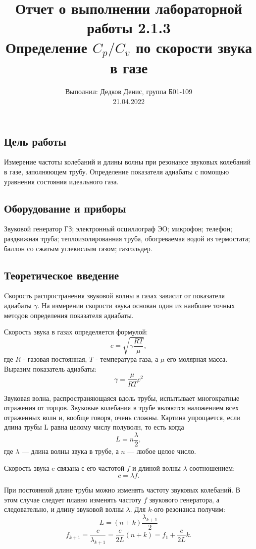 \documentclass[12pt,a4paper]{article}
\author{\normalsize Выполнил: Дедков Денис, группа Б01-109 \\
	\normalsize 21.04.2022}
\date{}
\title{
	\large Отчет о выполнении лабораторной работы 2.1.3 \\
	\Large Определение $C_p/C_v$ по скорости звука в газе \\ 
	
}
\begin{document}
	\maketitle
	
\subsection*{Цель работы}
Измерение частоты колебаний и длины волны при резонансе звуковых колебаний в газе, заполняющем трубу.
Определение показателя адиабаты с помощью уравнения состояния идеального газа.

\subsection*{Оборудование и приборы} 
Звуковой генератор ГЗ;
электронный осциллограф ЭО;
микрофон;
телефон;
раздвижная труба;
теплоизолированная труба, обогреваемая водой из термостата;
баллон со сжатым углекислым газом;
газгольдер.
	
	
\subsection*{Теоретическое введение}

Cкорость распространения звуковой волны в газах зависит от показателя адиабаты $\gamma$.
На измерении скорости звука основан один из наиболее  точных методов определения показателя  адиабаты.

Скорость звука в газах определяется формулой:
$$c=\sqrt{\gamma\frac{RT}{\mu}},$$
где $R$ - газовая постоянная, $T$ - температура газа, а $\mu$ его молярная масса.
Выразим показатель адиабаты:
$$\gamma=\frac{\mu}{RT} c^2$$

Звуковая волна, распространяющаяся вдоль трубы, испытывает многократные отражения от торцов.
Звуковые колебания в трубе являются наложением всех отраженных волн и, вообще говоря, очень сложны.
Картина упрощается, если длина трубы L равна целому числу полуволн, то есть когда
$$L=n\frac{\lambda}{2},$$
где $\lambda$ — длина волны звука в трубе, а $n$ — любое целое число.

Скорость звука c связана с его частотой $f$ и длиной волны $\lambda$ соотношением:
$$c=\lambda f.$$

При постоянной длине трубы можно изменять частоту звуковых
колебаний.
В этом случае следует плавно изменять частоту $f$ звукового генератора, а следовательно, и длину звуковой волны $\lambda$.
Для $k$-ого резонанса получим:
$$L = (n+k)\frac{\lambda_{k+1}}{2}$$
$$f_{k+1} = \frac{c}{\lambda_{k+1}}=\frac{c}{2L}(n+k)=f_1 + \frac{c}{2L}k.$$
\end{document}
